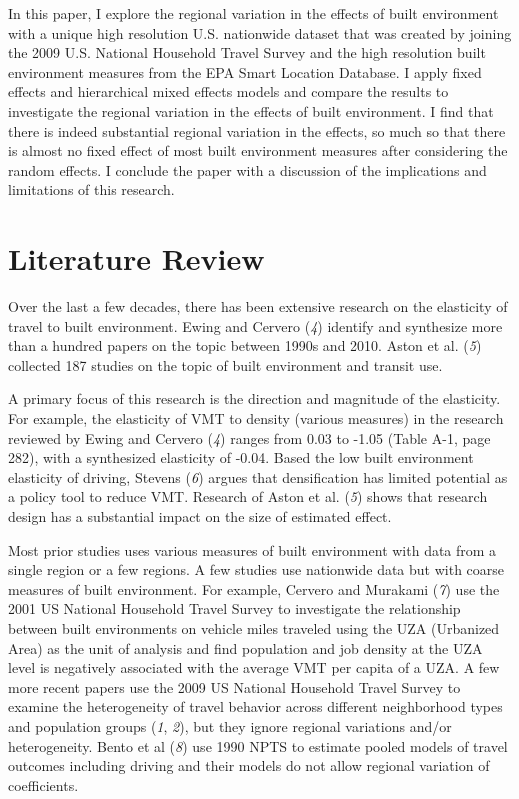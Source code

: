 \documentclass[numbered]{trbunofficial}
\begin{document}
In this paper, I explore the regional variation in the effects of built environment with a unique high resolution U.S. nationwide dataset that was created by joining the 2009 U.S. National Household Travel Survey and the high resolution built environment measures from the EPA Smart Location Database. I apply fixed effects and hierarchical mixed effects models and compare the results to investigate the regional variation in the effects of built environment. I find that there is indeed substantial regional variation in the effects, so much so that there is almost no fixed effect of most built environment measures after considering the random effects. I conclude the paper with a discussion of the implications and limitations of this research.

\hypertarget{literature-review}{%
\section{Literature Review}\label{literature-review}}

Over the last a few decades, there has been extensive research on the elasticity of travel to built environment. Ewing and Cervero (\emph{4}) identify and synthesize more than a hundred papers on the topic between 1990s and 2010. Aston et al. (\emph{5}) collected 187 studies on the topic of built environment and transit use.

A primary focus of this research is the direction and magnitude of the elasticity. For example, the elasticity of VMT to density (various measures) in the research reviewed by Ewing and Cervero (\emph{4}) ranges from 0.03 to -1.05 (Table A-1, page 282), with a synthesized elasticity of -0.04. Based the low built environment elasticity of driving, Stevens (\emph{6}) argues that densification has limited potential as a policy tool to reduce VMT. Research of Aston et al. (\emph{5}) shows that research design has a substantial impact on the size of estimated effect.

Most prior studies uses various measures of built environment with data from a single region or a few regions. A few studies use nationwide data but with coarse measures of built environment. For example, Cervero and Murakami (\emph{7}) use the 2001 US National Household Travel Survey to investigate the relationship between built environments on vehicle miles traveled using the UZA (Urbanized Area) as the unit of analysis and find population and job density at the UZA level is negatively associated with the average VMT per capita of a UZA. A few more recent papers use the 2009 US National Household Travel Survey to examine the heterogeneity of travel behavior across different neighborhood types and population groups (\emph{1}, \emph{2}), but they ignore regional variations and/or heterogeneity. Bento et al (\emph{8}) use 1990 NPTS to estimate pooled models of travel outcomes including driving and their models do not allow regional variation of coefficients.
\end{document}
